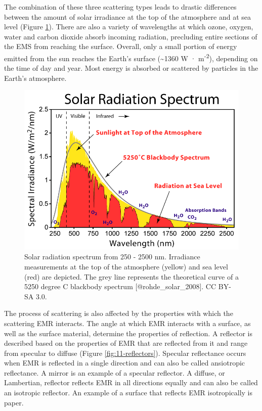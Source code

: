 \documentclass[
]{book}
\begin{document}
The combination of these three scattering types leads to drastic
differences between the amount of solar irradiance at the top of the
atmosphere and at sea level (Figure \ref{fig:11-solar-radiation}).
There are also a variety of wavelengths at which ozone, oxygen, water
and carbon dioxide absorb incoming radiation, precluding entire
sections of the EMS from reaching the surface. Overall, only a small
portion of energy emitted from the sun reaches the Earth's surface
(\textasciitilde1360 W · m\textsuperscript{-2}), depending on the time of day and year. Most
energy is absorbed or scattered by particles in the Earth's
atmosphere.

\begin{figure}
\includegraphics[width=11.11in]{images/11-solar-radiation} \caption{Solar radiation spectrum from 250 - 2500 nm. Irradiance measurements at the top of the atmosphere (yellow) and sea level (red) are depicted. The grey line represents the theoretical curve of a 5250 degree C blackbody spectrum [@rohde_solar_2008]. CC BY-SA 3.0.}\label{fig:11-solar-radiation}
\end{figure}

The process of scattering is also affected by the properties with which
the scattering EMR interacts. The angle at which EMR interacts with a
surface, as well as the surface material, determine the properties of
reflection. A reflector is described based on the properties of EMR that
are reflected from it and range from specular to diffuse (Figure
\ref{fig:11-reflectors}). Specular reflectance occurs when EMR is
reflected in a single direction and can also be called ansiotropic
reflectance. A mirror is an example of a specular reflector. A diffuse,
or Lambertian, reflector reflects EMR in all directions equally and can
also be called an isotropic reflector. An example of a surface that
reflects EMR isotropically is paper.
\end{document}
